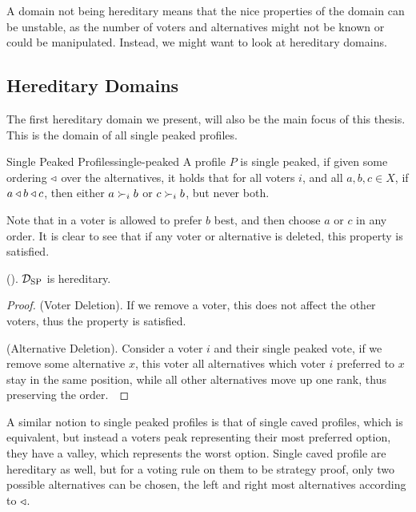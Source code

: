 A domain not being hereditary means that the nice properties of the domain can be unstable, as the number of voters and alternatives might not be known or could be manipulated. Instead, we might want to look at hereditary domains.

\subsection{Hereditary Domains}

The first hereditary domain we present, will also be the main focus of this thesis. This is the domain of all single peaked profiles.

\begin{definition}{Single Peaked Profiles}{single-peaked}
	A profile $P$ is single peaked, if given some ordering $\triangleleft$ over the alternatives, it holds that for all voters $i$, and all $a, b, c \in X$, if $a \triangleleft b \triangleleft c$, then either $a \succ_i b$ or $c \succ_i b$, but never both.
\end{definition}

Note that in  a voter is allowed to prefer $b$ best, and then choose $a$ or $c$ in any order. It is clear to see that if any voter or alternative is deleted, this property is satisfied.

\begin{proposition}{\textnormal{(\citet{elkindPreferenceRestrictionsComputational2022a}).}}
	$\mathcal{D}_{\text{SP}}$ is hereditary.
\end{proposition}

\begin{proof}
	(Voter Deletion). If we remove a voter, this does not affect the other voters, thus the property is satisfied.~\checkmark

	(Alternative Deletion). Consider a voter $i$ and their single peaked vote, if we remove some alternative $x$, this voter all alternatives which voter $i$ preferred to $x$ stay in the same position, while all other alternatives move up one rank, thus preserving the order.~\checkmark
\end{proof}

A similar notion to single peaked profiles is that of single caved profiles, which is equivalent, but instead a voters peak representing their most preferred option, they have a valley, which represents the worst option. Single caved profile are hereditary as well, but for a voting rule on them to be strategy proof, only two possible alternatives can be chosen, the left and right most alternatives according to $\triangleleft$.

